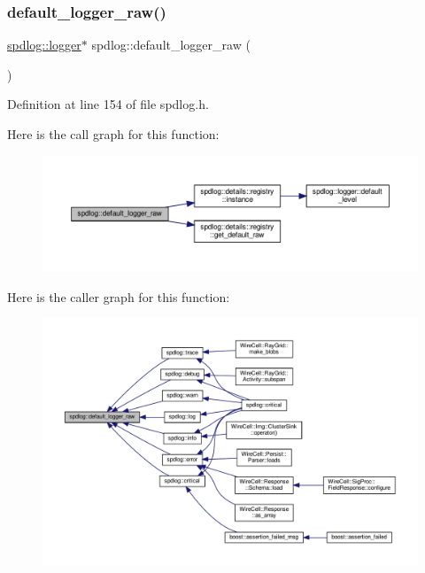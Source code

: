 \subsubsection{\texorpdfstring{default\+\_\+logger\+\_\+raw()}{default\_logger\_raw()}}
{\footnotesize\ttfamily \hyperlink{classspdlog_1_1logger}{spdlog\+::logger}$\ast$ spdlog\+::default\+\_\+logger\+\_\+raw (\begin{DoxyParamCaption}{ }\end{DoxyParamCaption})\hspace{0.3cm}{\ttfamily [inline]}}



Definition at line 154 of file spdlog.\+h.

Here is the call graph for this function\+:
\nopagebreak
\begin{figure}[H]
\begin{center}
\leavevmode
\includegraphics[width=350pt]{namespacespdlog_a2c623c9fadba3efc09b48dac8a3990be_cgraph}
\end{center}
\end{figure}
Here is the caller graph for this function\+:
\nopagebreak
\begin{figure}[H]
\begin{center}
\leavevmode
\includegraphics[width=350pt]{namespacespdlog_a2c623c9fadba3efc09b48dac8a3990be_icgraph}
\end{center}
\end{figure}
\mbox{\label{namespacespdlog_af2ec5792fb30798cf285da36cb5c9377}} 

